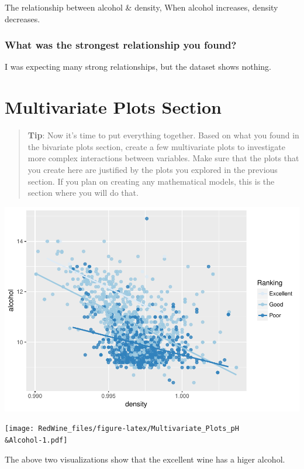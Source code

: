 \documentclass[]{article}
\begin{document}
The relationship between alcohol \& density, When alcohol increases,
density decreases.

\subsubsection{What was the strongest relationship you
found?}\label{what-was-the-strongest-relationship-you-found}

I was expecting many strong relationships, but the dataset shows
nothing.

\section{Multivariate Plots Section}\label{multivariate-plots-section}

\begin{quote}
\textbf{Tip}: Now it's time to put everything together. Based on what
you found in the bivariate plots section, create a few multivariate
plots to investigate more complex interactions between variables. Make
sure that the plots that you create here are justified by the plots you
explored in the previous section. If you plan on creating any
mathematical models, this is the section where you will do that.
\end{quote}

\includegraphics{RedWine_files/figure-latex/Multivariate_Plots-1.pdf}

\texttt{[image: RedWine\_files/figure-latex/Multivariate\_Plots\_pH\\\&Alcohol-1.pdf]}

The above two visualizations show that the excellent wine has a higer
alcohol.
\end{document}
